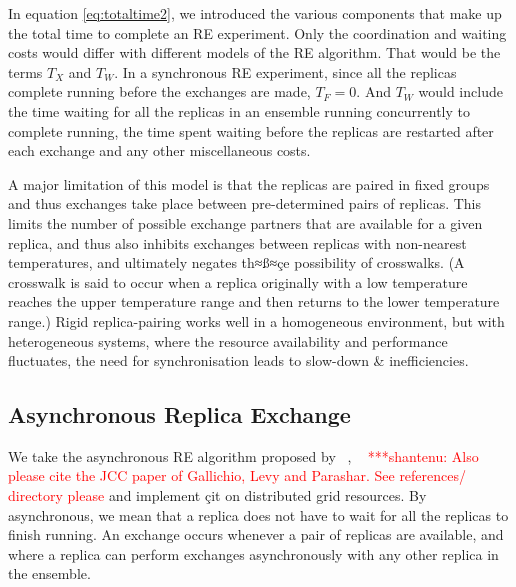 \documentclass{rspublic}
\newcommand{\jhanote}[1]{ {\textcolor{red} { ***shantenu: #1 }}}
\newcommand{\athotanote}[1]{ {\textcolor{green} { ***athota: #1 }}}
\newcommand{\athotanote}[1]{}
\newcommand{\jhanote}[1]{}
\begin{document}

In equation \ref{eq:totaltime2}, we introduced the various components
that make up the total time to complete an RE experiment. Only the
coordination and waiting costs would differ with different models of
the RE algorithm. That would be the terms $T_{X}$ and $T_W$. In a
synchronous RE experiment, since all the replicas complete running
before the exchanges are made, $T_F = 0$. And $T_W$ would include the
time waiting for all the replicas in an ensemble running concurrently
to complete running, the time spent waiting before the replicas are
restarted after each exchange and any other miscellaneous costs.


A major limitation of this model is that the replicas are paired in
fixed groups and thus exchanges take place between pre-determined
pairs of replicas.  This limits the number of possible exchange
partners that are available for a given replica, and thus also
inhibits exchanges between replicas with non-nearest temperatures, and
ultimately negates th≈ß≈çe possibility of crosswalks. (A crosswalk is said
to occur when a replica originally with a low temperature reaches the
upper temperature range and then returns to the lower temperature
range.)  Rigid replica-pairing works well in a homogeneous
environment, but with heterogeneous systems, where the resource
availability and performance fluctuates, the need for synchronisation
leads to slow-down \& inefficiencies.

 
\subsection{Asynchronous Replica Exchange}


We take the asynchronous RE algorithm proposed by
~\citep{parashar_arepex}, ~\citep{??} \jhanote{Also please cite the
  JCC paper of Gallichio, Levy and Parashar. See references/ directory
  please} and implement çit on distributed grid resources. By
asynchronous, we mean that a replica does not have to wait for all the
replicas to finish running. An exchange occurs whenever a pair of
replicas are available, and where a replica can perform exchanges
asynchronously with any other replica in the ensemble.
\end{document}
